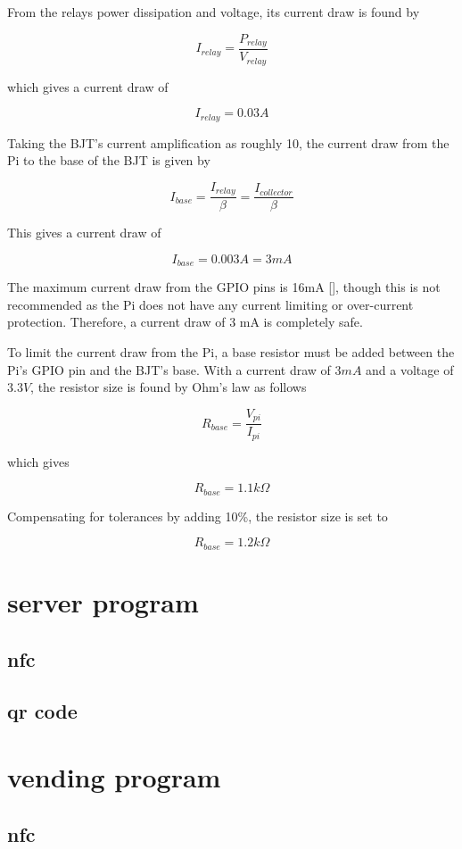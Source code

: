 From the relays power dissipation and voltage, its current draw is found by

\[
I_{relay} = \frac{P_{relay}}{V_{relay}}
\]

which gives a current draw of

\[
I_{relay} = 0.03A
\]

Taking the BJT's current amplification as roughly 10, the current draw from the Pi to the
base of the BJT is given by

\[
I_{base} = \frac{I_{relay}}{\beta} = \frac{I_{collector}}{\beta}
\]

This gives a current draw of

\[
I_{base} = 0.003A = 3mA
\]

The maximum current draw from the GPIO pins is 16mA [\cite{website:gpio-specs}], though this is
not recommended as the Pi does not have any current limiting or over-current protection.
Therefore, a current draw of 3 mA is completely safe.

To limit the current draw from the Pi, a base resistor must be added between the Pi's GPIO pin
and the BJT's base. With a current draw of $3mA$ and a voltage of $3.3V$, the resistor size is
found by Ohm's law as follows

\[
R_{base} = \frac{V_{pi}}{I_{pi}}
\]

which gives

\[
R_{base} = 1.1k\Omega
\]

Compensating for tolerances by adding 10\%, the resistor size is set to

\[R_{base} = 1.2k\Omega\]

\section{server program}
\subsection{nfc}
\subsection{qr code}

\section{vending program}
\subsection{nfc}

